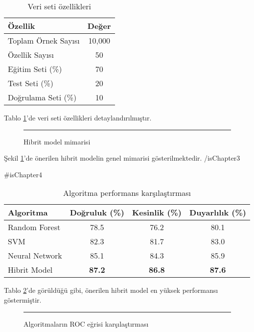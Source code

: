\documentclass[12pt,a4paper,oneside]{report}
\begin{document}
\begin{table}[h!]
\centering
\caption{Veri seti özellikleri}
\label{tab:dataset}
\begin{tabular}{|l|c|}
\hline
\textbf{Özellik} & \textbf{Değer} \\
\hline
Toplam Örnek Sayısı & 10,000 \\
Özellik Sayısı & 50 \\
Eğitim Seti (\%) & 70 \\
Test Seti (\%) & 20 \\
Doğrulama Seti (\%) & 10 \\
\hline
\end{tabular}
\end{table}

Tablo \ref{tab:dataset}'de veri seti özellikleri detaylandırılmıştır.

\begin{figure}[h!]
\centering
\rule{10cm}{6cm} %
\caption{Hibrit model mimarisi}
\label{fig:model_architecture}
\end{figure}

Şekil \ref{fig:model_architecture}'de önerilen hibrit modelin genel mimarisi gösterilmektedir.
{{/isChapter3}}

{{#isChapter4}}

\begin{table}[h!]
\centering
\caption{Algoritma performans karşılaştırması}
\label{tab:performance}
\begin{tabular}{|l|c|c|c|}
\hline
\textbf{Algoritma} & \textbf{Doğruluk (\%)} & \textbf{Kesinlik (\%)} & \textbf{Duyarlılık (\%)} \\
\hline
Random Forest & 78.5 & 76.2 & 80.1 \\
SVM & 82.3 & 81.7 & 83.0 \\
Neural Network & 85.1 & 84.3 & 85.9 \\
Hibrit Model & \textbf{87.2} & \textbf{86.8} & \textbf{87.6} \\
\hline
\end{tabular}
\end{table}

Tablo \ref{tab:performance}'de görüldüğü gibi, önerilen hibrit model en yüksek performansı göstermiştir.

\begin{figure}[h!]
\centering
\rule{10cm}{6cm} %
\caption{Algoritmaların ROC eğrisi karşılaştırması}
\label{fig:roc_curve}
\end{figure}
\end{document}
